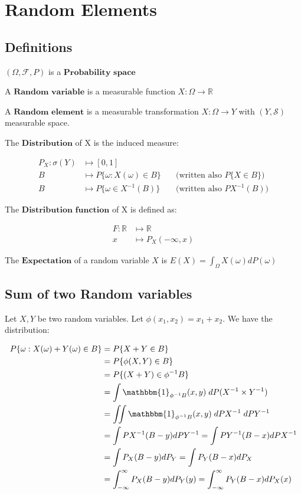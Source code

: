 
\section{Random Elements}

\subsection{Definitions}

$(\Omega, \mathcal{F}, P)$ is a $\textbf{Probability space}$

\noindent A $\textbf{Random variable}$ is a measurable function $X : \Omega \rightarrow \mathbb{R}$

\noindent A $\textbf{Random element}$ is a measurable transformation $X : \Omega \rightarrow Y$ with $(Y, \mathcal{S})$ measurable space.

\noindent The $\textbf{Distribution}$ of X is the induced measure:

\begin{align*}
P_X : \sigma(Y) &\longmapsto [0,1] \\
    B &\longmapsto P\{\omega: X(\omega) \in B\} \quad &\text{(written also $P\{X \in B\}$)} \\
B &\longmapsto P\{\omega \in X^{-1}(B)\} &\text{(written also $PX^{-1}(B)$)}
\end{align*}

\noindent The $\textbf{Distribution function}$ of X is defined as: 

\begin{align*}
    F:\mathbb{R} &\longmapsto \mathbb{R} \\
x &\longmapsto P_X(-\infty, x)
\end{align*}

\noindent The $\textbf{Expectation}$ of a random variable $X$ is $E(X) = \displaystyle\int_{\Omega} X(\omega)dP(\omega)$


\subsection{Sum of two Random variables}
Let $X,Y$ be two random variables. Let $\phi(x_1,x_2) = x_1 + x_2$. We have the distribution:

\begin{align*}
P\{\omega: X(\omega)+Y(\omega) \in B\} &= P\{X+Y \in B\} \\
&= P\{\phi(X,Y) \in B\} \\
&= P\{(X+Y) \in \phi^{-1}B\} \\
&= \int \mathbbm{1}_{\phi^{-1}B}(x,y)\;dP(X^{-1}\times Y^{-1}) \\
&= \iint \mathbbm{1}_{\phi^{-1}B}(x,y)\;dPX^{-1}\; dPY^{-1} \\
&= \int PX^{-1}(B-y) dPY^{-1} = \int PY^{-1}(B-x) dPX^{-1} \\
&= \int P_X(B-y) dP_Y = \int P_Y(B-x) dP_X \\
&= \int_{-\infty}^{\infty} P_X(B-y) dP_Y(y) = \int_{-\infty}^{\infty} P_Y(B-x) dP_X(x) \\
\end{align*}

